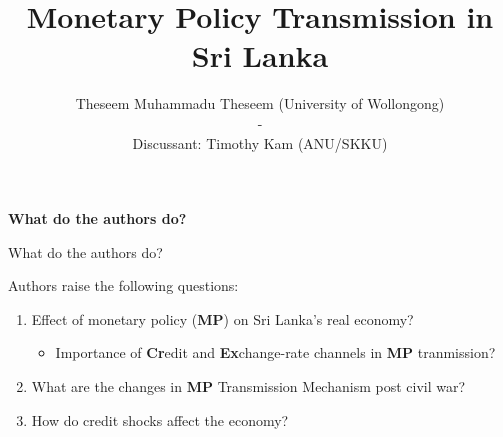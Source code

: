 \documentclass[10pt,english,slidetop,compress,
              blue,mathserif,color=option]{beamer}
\title[]{Monetary Policy Transmission in Sri Lanka}
\author[        ]{          
  Theseem Muhammadu Theseem {\color{gray}(University of Wollongong)} 
                      \\
                      -
                      \\
                       Discussant: Timothy Kam {\color{gray}(ANU/SKKU)}
                      }
\date{ \color{gray!80!blue}

      {\smaller PhD Conference, Nov 11-12, 2021}
      \\
      \bigskip
      
}
\theoremstyle{plain}
\theoremstyle{definition}
\begin{document}
\begin{frame}
  \titlepage
\end{frame}



{
  \begin{frame}
    \begin{center}
      \bigskip
      \bigskip
      {\Huge\bfseries{\color{orange}What do the authors do?}}
      \bigskip

    \end{center}
  \end{frame}
}

\begin{frame}{What do the authors do?}

  Authors raise the following questions:
  \bigskip

  \begin{enumerate}
    \item Effect of monetary policy (\textbf{MP}) on Sri Lanka's real economy?
    \begin{itemize}
      \item Importance of \textbf{Cr}edit and \textbf{Ex}change-rate channels in \textbf{MP} tranmission?
    \end{itemize}

    \bigskip

    \item What are the changes in \textbf{MP} Transmission Mechanism post civil war?
    
    \bigskip

  \item How do credit shocks affect the economy?
  \end{enumerate}

\end{frame}
\end{document}
